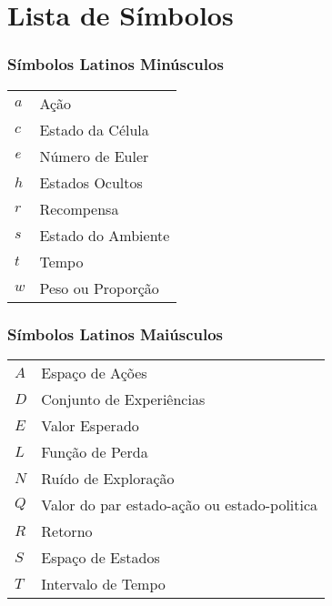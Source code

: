 \chapter*{Lista de Símbolos} %

\subsection*{Símbolos Latinos Minúsculos}

\begin{tabular}{p{}p{}}
$a$ & Ação \\
$c$ & Estado da Célula \\
$\mathnormal{e}$ & Número de Euler \\
$h$ & Estados Ocultos \\
$r$ & Recompensa \\
$s$ & Estado do Ambiente \\
$t$ & Tempo \\
$w$ & Peso ou Proporção \\
\end{tabular}

\subsection*{Símbolos Latinos Maiúsculos}

\begin{tabular}{p{}p{}}
$A$ & Espaço de Ações \\
$D$ & Conjunto de Experiências \\
$E$ & Valor Esperado \\
$L$ & Função de Perda \\
$N$ & Ruído de Exploração \\
$Q$ & Valor do par estado-ação ou estado-politica \\
$R$ & Retorno \\
$S$ & Espaço de Estados \\
$T$ & Intervalo de Tempo \\
\end{tabular}



